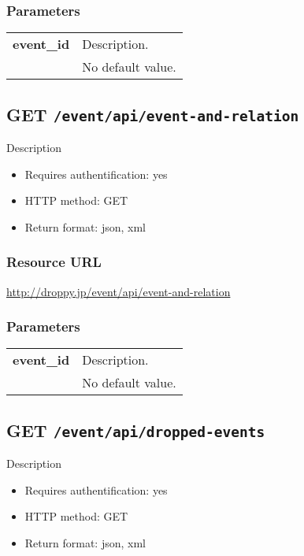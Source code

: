 \documentclass[11pt,a4paper]{article}
\newcommand{\content}[1]{\begin{minipage}{10cm}\vspace{2mm}#1\vspace{2mm}\end{minipage}}
\begin{document}
  \subsubsection*{Parameters}
  \begin{table}[h]
    \begin{center}
      \begin{tabular}{l l}
        \hline 
      \textbf{event\_id} & \content{Description. }
      \\
       & No default value.\\
      \hline
      \end{tabular}
    \end{center}
  \end{table}
  
      \newpage
      
      
  \subsection*{GET {\tt /event/api/event-and-relation}}
  Description
  \begin{itemize}
  \item Requires authentification: yes
  \item HTTP method: GET
  \item Return format: json, xml
  \end{itemize}
  \subsubsection*{Resource URL}
  \url{http://droppy.jp/event/api/event-and-relation}
  \subsubsection*{Parameters}
  \begin{table}[h]
    \begin{center}
      \begin{tabular}{l l}
        \hline 
      \textbf{event\_id} & \content{Description. }
      \\
       & No default value.\\
      \hline
      \end{tabular}
    \end{center}
  \end{table}
  
      \newpage
      
      
  \subsection*{GET {\tt /event/api/dropped-events}}
  Description
  \begin{itemize}
  \item Requires authentification: yes
  \item HTTP method: GET
  \item Return format: json, xml
  \end{itemize}
\end{document}
